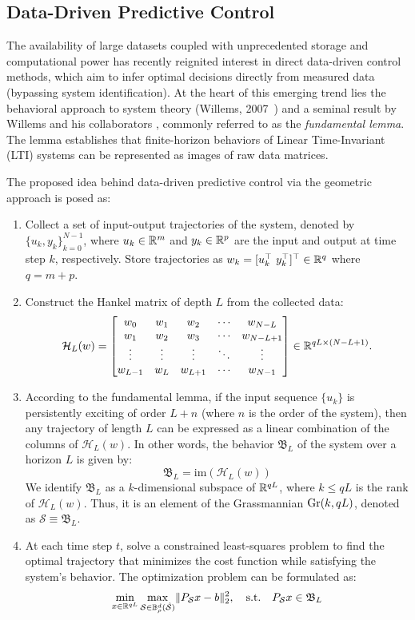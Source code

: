 \subsection{Data-Driven Predictive Control}

The availability of large datasets coupled with unprecedented storage and computational power has recently reignited interest in direct data-driven control methods, which aim to infer optimal decisions directly from measured data (bypassing system identification). At the heart of this emerging trend lies the behavioral approach to system theory (Willems, 2007~\cite{willems2007}) and a seminal result by Willems and his collaborators \cite{willems2005}, commonly referred to as the \textit{fundamental lemma}. The lemma establishes that finite-horizon behaviors of Linear Time-Invariant (LTI) systems can be represented as images of raw data matrices. 

The proposed idea behind data-driven predictive control via the geometric approach is posed as:
\begin{enumerate}
    \item Collect a set of input-output trajectories of the system, denoted by ${\{u_k, y_k\}}_{k=0}^{N-1}$, where $u_k \in \mathbb{R}^m$ and $y_k \in \mathbb{R}^p$ are the input and output at time step $k$, respectively. Store trajectories as $w_k = [u_k^\top \ y_k^\top]^\top \in \mathbb{R}^{q}$ where $q = m + p$.
    \item Construct the Hankel matrix of depth $L$ from the collected data:
    \[
        \mathcal{H}_L(w) = \begin{bmatrix}
            w_0 & w_1 & w_2 & \cdots & w_{N-L} \\
            w_1 & w_2 & w_3 & \cdots & w_{N-L+1} \\
            \vdots & \vdots & \vdots & \ddots & \vdots \\
            w_{L-1} & w_L & w_{L+1} & \cdots & w_{N-1}
        \end{bmatrix} \in \mathbb{R}^{qL \times (N-L+1)}.
    \]
    \item According to the fundamental lemma, if the input sequence $\{u_k\}$ is persistently exciting of order $L + n$ (where $n$ is the order of the system), then any trajectory of length $L$ can be expressed as a linear combination of the columns of $\mathcal{H}_L(w)$. In other words, the behavior $\mathfrak{B}_L$ of the system over a horizon $L$ is given by:
    \[
        \mathfrak{B}_L = \textrm{im}(\mathcal{H}_L(w)) 
    \]
    We identify $\mathfrak{B}_L$ as a $k$-dimensional subspace of $\mathbb{R}^{qL}$, where $k \leq qL$ is the rank of $\mathcal{H}_L(w)$. Thus, it is an element of the Grassmannian $\text{Gr}(k, qL)$, denoted as $\mathcal{S} \equiv \mathfrak{B}_L$.
    \item At each time step $t$, solve a constrained least-squares problem to find the optimal trajectory that minimizes the cost function while satisfying the system's behavior. The optimization problem can be formulated as:
    \[
        \min_{x \in \mathbb{R}^{qL}} \max_{\mathcal{S} \in \mathbb{B}^d_{\rho}(\hat{\mathcal{S}})} \lVert P_{\mathcal{S}} x - b \rVert_2^2 , \quad \textrm{s.t.} \quad P_{\mathcal{S}}x \in \mathfrak{B}_L
    \]
   
\end{enumerate}


